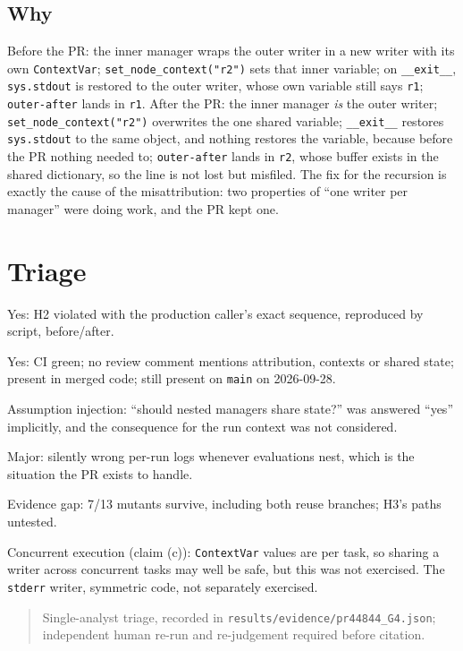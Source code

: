 \documentclass[11pt,a4paper]{article}
\newcommand{\code}[1]{\texttt{#1}}
\newcommand{\note}[1]{\begin{quote}\small\color{black!70}#1\end{quote}}
\begin{document}
\subsection{Why}
Before the PR: the inner manager wraps the outer writer in a new writer with its own \code{ContextVar}; \code{set\_node\_context("r2")} sets that inner variable; on \code{\_\_exit\_\_}, \code{sys.stdout} is restored to the outer writer, whose own variable still says \code{r1}; \code{outer-after} lands in \code{r1}. After the PR: the inner manager \emph{is} the outer writer; \code{set\_node\_context("r2")} overwrites the one shared variable; \code{\_\_exit\_\_} restores \code{sys.stdout} to the same object, and nothing restores the variable, because before the PR nothing needed to; \code{outer-after} lands in \code{r2}, whose buffer exists in the shared dictionary, so the line is not lost but misfiled. The fix for the recursion is exactly the cause of the misattribution: two properties of ``one writer per manager'' were doing work, and the PR kept one.

\section{Triage}
\begin{description}[nosep]
  \item[Confirmed defect?] Yes: H2 violated with the production caller's exact sequence, reproduced by script, before/after.
  \item[Escaped?] Yes: CI green; no review comment mentions attribution, contexts or shared state; present in merged code; still present on \code{main} on 2026-09-28.
  \item[Failure mode.] Assumption injection: ``should nested managers share state?'' was answered ``yes'' implicitly, and the consequence for the run context was not considered.
  \item[Severity.] Major: silently wrong per-run logs whenever evaluations nest, which is the situation the PR exists to handle.
  \item[Second finding.] Evidence gap: 7/13 mutants survive, including both reuse branches; H3's paths untested.
  \item[Not evaluated.] Concurrent execution (claim (c)): \code{ContextVar} values are per task, so sharing a writer across concurrent tasks may well be safe, but this was not exercised. The \code{stderr} writer, symmetric code, not separately exercised.
\end{description}
\note{Single-analyst triage, recorded in \code{results/evidence/pr44844\_G4.json}; independent human re-run and re-judgement required before citation.}
\end{document}
